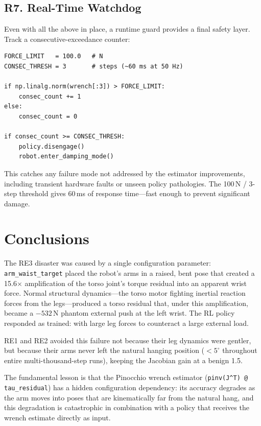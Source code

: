\documentclass[11pt,a4paper]{article}
\begin{document}
\subsection{R7. Real-Time Watchdog}
\label{sec:rec_watchdog}

Even with all the above in place, a runtime guard provides a final safety
layer.  Track a consecutive-exceedance counter:
\begin{lstlisting}
FORCE_LIMIT   = 100.0   # N
CONSEC_THRESH = 3       # steps (~60 ms at 50 Hz)

if np.linalg.norm(wrench[:3]) > FORCE_LIMIT:
    consec_count += 1
else:
    consec_count = 0

if consec_count >= CONSEC_THRESH:
    policy.disengage()
    robot.enter_damping_mode()
\end{lstlisting}
This catches any failure mode not addressed by the estimator improvements,
including transient hardware faults or unseen policy pathologies.  The
100\,N / 3-step threshold gives 60\,ms of response time---fast enough to
prevent significant damage.

\section{Conclusions}

The RE3 disaster was caused by a single configuration parameter:
\texttt{arm\_waist\_target} placed the robot's arms in a raised, bent pose
that created a 15.6$\times$ amplification of the torso joint's torque
residual into an apparent wrist force.  Normal structural dynamics---the
torso motor fighting inertial reaction forces from the legs---produced a
torso residual that, under this amplification, became a $-532$\,N phantom
external push at the left wrist.  The RL policy responded as trained:
with large leg forces to counteract a large external load.

RE1 and RE2 avoided this failure not because their leg dynamics were
gentler, but because their arms never left the natural hanging position
($< 5^\circ$ throughout entire multi-thousand-step runs), keeping the
Jacobian gain at a benign 1.5.

The fundamental lesson is that the Pinocchio wrench estimator
(\texttt{pinv(J\^{}T) @ tau\_residual}) has a hidden configuration
dependency: its accuracy degrades as the arm moves into poses that are
kinematically far from the natural hang, and this degradation is
catastrophic in combination with a policy that receives the wrench estimate
directly as input.
\end{document}
